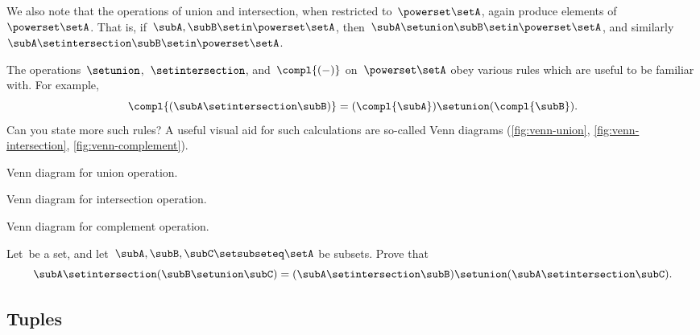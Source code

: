 We also note that the operations of union and intersection, when restricted to~$\powerset \setA$, again produce elements of~$\powerset \setA$.
That is, if~$\subA, \subB \setin\powerset \setA$, then~$\subA \setunion \subB \setin\powerset \setA$, and similarly~$\subA \setintersection \subB \setin\powerset \setA$.

The operations~$\setunion$,~$\setintersection$, and~$\compl{( - )}$ on~$\powerset \setA$ obey various rules which are useful to be familiar with.
For example,
\begin{equation}
    \compl{(\subA \setintersection \subB)} = (\compl{\subA}) \setunion (\compl{\subB}).
\end{equation}
Can you state more such rules?
A useful visual aid for such calculations are so-called Venn diagrams (\cref{fig:venn-union}, \cref{fig:venn-intersection}, \cref{fig:venn-complement}).

\begin{marginfigure}
    \centering
    \caption{Venn diagram for union operation.}
    \label{fig:venn-union}
\end{marginfigure}

\begin{marginfigure}
    \centering
    \caption{Venn diagram for intersection operation.}
    \label{fig:venn-intersection}
\end{marginfigure}

\begin{marginfigure}
    \centering
    \caption{Venn diagram for complement operation.}
    \label{fig:venn-complement}
\end{marginfigure}

\begin{gradedexercise}
    \label{ex:distributing-subsets}
    Let~\setA be a set, and let~$\subA, \subB, \subC \setsubseteq \setA$ be subsets.
    Prove that
    \begin{equation}
        \subA \setintersection (\subB \setunion \subC) = (\subA \setintersection \subB) \setunion (\subA \setintersection \subC).
    \end{equation}
\end{gradedexercise}


\subsection{Tuples}
\label{sec:tuples}

